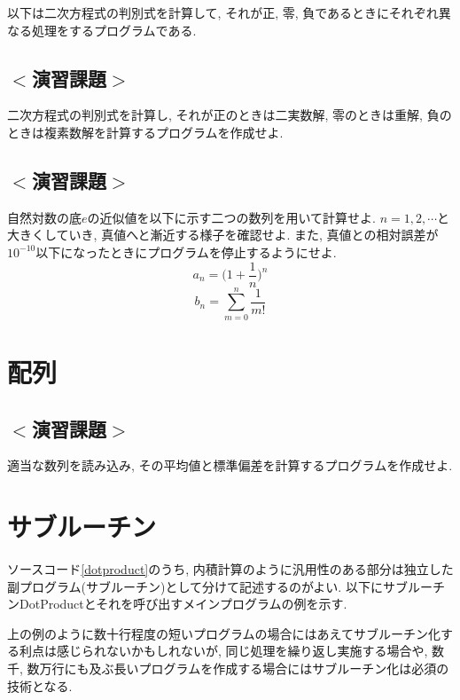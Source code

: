 \documentclass[a4j]{jsbook}
\begin{document}
以下は二次方程式の判別式を計算して, それが正, 零, 負であるときにそれぞれ異なる処理をするプログラムである. 


\subsection*{$<$演習課題$>$}
二次方程式の判別式を計算し, それが正のときは二実数解, 
零のときは重解, 負のときは複素数解を計算するプログラムを作成せよ. 

\subsection*{$<$演習課題$>$}
自然対数の底$e$の近似値を以下に示す二つの数列を用いて計算せよ. 
$n=1, 2, \cdots$と大きくしていき, 真値へと漸近する様子を確認せよ.
また, 真値との相対誤差が$10^{-10}$以下になったときにプログラムを停止するようにせよ. 
\begin{equation}
a_n= \Big( 1+\frac{1}{n}\Big)^n
\end{equation}
\begin{equation}
b_n=\sum_{m=0}^{n}\frac{1}{m!}
\end{equation}



\section{配列}




\subsection*{$<$演習課題$>$}
適当な数列を読み込み, その平均値と標準偏差を計算するプログラムを作成せよ. 

\section{サブルーチン}
ソースコード\ref{dotproduct}のうち, 
内積計算のように汎用性のある部分は独立した副プログラム(サブルーチン)として分けて記述するのがよい. 
以下にサブルーチンDotProductとそれを呼び出すメインプログラムの例を示す. 

上の例のように数十行程度の短いプログラムの場合にはあえてサブルーチン化する利点は感じられないかもしれないが, 
同じ処理を繰り返し実施する場合や, 
数千, 数万行にも及ぶ長いプログラムを作成する場合にはサブルーチン化は必須の技術となる. 
\end{document}
